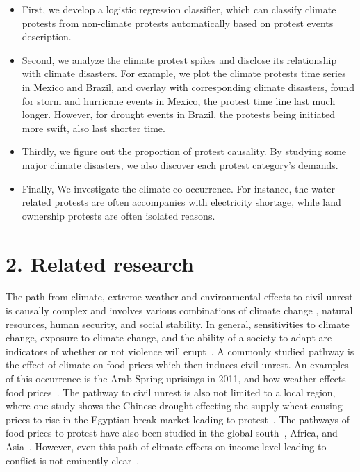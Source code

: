 \documentclass[9pt,twocolumn,twoside]{pnas-new}
\begin{document}

\begin{itemize}
  \item First, we develop a logistic regression classifier, which can classify climate protests from non-climate protests automatically based on protest events description.
  \item Second, we analyze the climate protest spikes and disclose its relationship with climate disasters. For example, we plot the climate protests time series in Mexico and Brazil, and overlay with corresponding climate disasters, found for storm and hurricane events in Mexico, the protest time line last much longer. However, for drought events in Brazil, the protests being initiated more swift, also last shorter time.
  \item Thirdly, we figure out the proportion of protest causality. By studying some major climate disasters, we also discover each protest category's demands.
  \item Finally, We investigate the climate co-occurrence. For instance, the water related protests are often accompanies with electricity shortage, while land ownership protests are often isolated reasons.
\end{itemize}
%

%

%
%
\section{2. Related research}
The path from climate, extreme weather and environmental effects to civil unrest is causally complex \cite{hsiang2011civil,RW5} and involves various combinations of climate change \cite{burke2014climate}, natural resources, human security, and social stability.
In general, sensitivities to climate change, exposure to climate change, and the ability of a society to adapt are indicators of whether or not violence will erupt~\cite{RW9}.
A commonly studied pathway is the effect of climate on food prices which then induces civil unrest.
An examples of this occurrence is the Arab Spring uprisings in 2011, and how weather effects food prices~\cite{RW2}.
The pathway to civil unrest is also not limited to a local region, where one study shows the Chinese drought effecting the supply wheat causing prices to rise in the Egyptian break market leading to protest~\cite{RW1}.
The pathways of food prices to protest have also been studied in the global south~\cite{RW4}, Africa, and Asia~\cite{wischnath2014climate,RW6}.
However, even this path of climate effects on income level leading to conflict is not eminently clear~\cite{RW10}.
\end{document}
